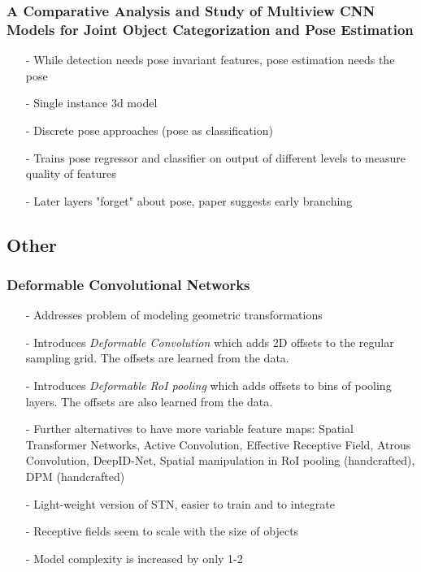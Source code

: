 \documentclass{article}
\begin{document}
\begin{multicols}{2}
	 	\subsubsection{A Comparative Analysis and Study of Multiview CNN Models for Joint Object Categorization and Pose Estimation\cite{Elhoseiny}}
	 	\begin{itemize}
	 		\item[-] While detection needs pose invariant features, pose estimation needs the pose
		 	\item[-] Single instance 3d model
		 	\item[-] Discrete pose approaches (pose as classification)
		 	\item[-] Trains pose regressor and classifier on output of different levels to measure quality of features
		 	\item[-] Later layers "forget" about pose, paper suggests early branching
	 	\end{itemize}
	\subsection{Other}
		 \subsubsection{Deformable Convolutional Networks \cite{Dai}}
		 \begin{itemize}
		 	\item[-] Addresses problem of modeling geometric transformations
		 	\item[-] Introduces \textit{Deformable Convolution} which adds 2D offsets to the regular sampling grid. The offsets are learned from the data.
		 	\item[-] Introduces \textit{Deformable RoI pooling} which adds offsets to bins of pooling layers. The offsets are also learned from the data.
		 	\item[-] Further alternatives to have more variable feature maps: Spatial Transformer Networks, Active Convolution, Effective Receptive Field, Atrous Convolution, DeepID-Net, Spatial manipulation in RoI pooling (handcrafted), DPM (handcrafted)
		 	\item[-] Light-weight version of STN, easier to train and to integrate
		 	\item[-] Receptive fields seem to scale with the size of objects
		 	\item[-] Model complexity is increased by only 1-2%
		 	\end{itemize}
		 	
\end{multicols}	
\end{document}
